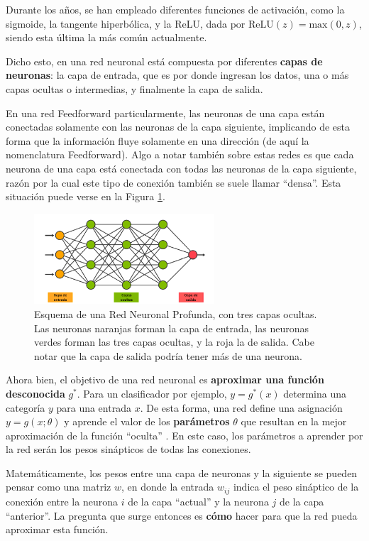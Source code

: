 \documentclass[../../main.tex]{subfiles}
\begin{document}
Durante los años, se han empleado diferentes funciones de activación, como la sigmoide, la tangente hiperbólica, y la ReLU, dada por \(\text{ReLU}(z)=\text{max}(0, z)\), siendo esta última la más común actualmente.

Dicho esto, en una red neuronal está compuesta por diferentes \textbf{capas de neuronas}: la capa de entrada, que es por donde ingresan los datos, una o más capas ocultas o intermedias, y finalmente la capa de salida. 

En una red Feedforward particularmente, las neuronas de una capa están conectadas solamente con las neuronas de la capa siguiente, implicando de esta forma que la información fluye solamente en una dirección (de aquí la nomenclatura Feedforward). Algo a notar también sobre estas redes es que cada neurona de una capa está conectada con todas las neuronas de la capa siguiente, razón por la cual este tipo de conexión también se suele llamar ``densa''. Esta situación puede verse en la Figura \ref{fig:neural-net}. 

\begin{figure}[h!]
    \centering
    \includegraphics[width=0.6\textwidth]{figs/feedforward.png}
    \caption{Esquema de una Red Neuronal Profunda, con tres capas ocultas. Las neuronas naranjas forman la capa de entrada, las neuronas verdes forman las tres capas ocultas, y la roja la de salida. Cabe notar que la capa de salida podría tener más de una neurona.}
    \label{fig:neural-net}
\end{figure}

Ahora bien, el objetivo de una red neuronal es \textbf{aproximar una función desconocida} \(g^*\). Para un clasificador por ejemplo, \(y=g^*(x)\) determina una categoría \(y\) para una entrada \(x\). De esta forma, una red define una asignación \(y=g(x; \theta)\) y aprende el valor de los \textbf{parámetros} \(\theta\) que resultan en la mejor aproximación de la función ``oculta'' \cite{deep-learning}. En este caso, los parámetros a aprender por la red serán los pesos sinápticos de todas las conexiones.

Matemáticamente, los pesos entre una capa de neuronas y la siguiente se pueden pensar como una matriz \(w\), en donde la entrada \(w_{ij}\) indica el peso sináptico de la conexión entre la neurona \(i\) de la capa ``actual'' y la neurona \(j\) de la capa ``anterior''. La pregunta que surge entonces es \textbf{cómo} hacer para que la red pueda aproximar esta función.
\end{document}
